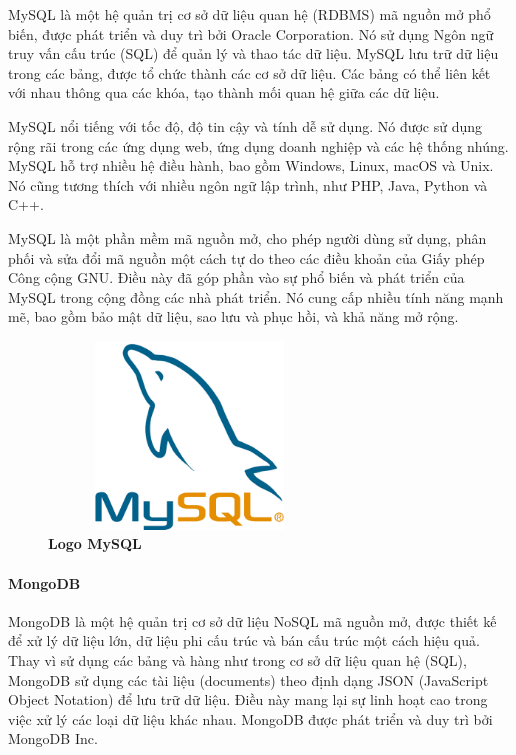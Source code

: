 MySQL là một hệ quản trị cơ sở dữ liệu quan hệ (RDBMS) mã nguồn mở phổ biến, được phát triển và duy trì bởi Oracle Corporation. Nó sử dụng Ngôn ngữ truy vấn cấu trúc (SQL) để quản lý và thao tác dữ liệu. MySQL lưu trữ dữ liệu trong các bảng, được tổ chức thành các cơ sở dữ liệu. Các bảng có thể liên kết với nhau thông qua các khóa, tạo thành mối quan hệ giữa các dữ liệu.

MySQL nổi tiếng với tốc độ, độ tin cậy và tính dễ sử dụng. Nó được sử dụng rộng rãi trong các ứng dụng web, ứng dụng doanh nghiệp và các hệ thống nhúng. MySQL hỗ trợ nhiều hệ điều hành, bao gồm Windows, Linux, macOS và Unix. Nó cũng tương thích với nhiều ngôn ngữ lập trình, như PHP, Java, Python và C++.

MySQL là một phần mềm mã nguồn mở, cho phép người dùng sử dụng, phân phối và sửa đổi mã nguồn một cách tự do theo các điều khoản của Giấy phép Công cộng GNU. Điều này đã góp phần vào sự phổ biến và phát triển của MySQL trong cộng đồng các nhà phát triển. Nó cung cấp nhiều tính năng mạnh mẽ, bao gồm bảo mật dữ liệu, sao lưu và phục hồi, và khả năng mở rộng.

\begin{figure}[H]
	\centering
	\includegraphics[width=7.5cm,height=5cm]{Images/Technology/mysql.png}
	\caption[Logo MySQL]{\bfseries \fontsize{12pt}{0pt}
		\selectfont Logo MySQL}
	\label{mysql} %
\end{figure}

\paragraph{MongoDB}
\mbox{}

MongoDB là một hệ quản trị cơ sở dữ liệu NoSQL mã nguồn mở, được thiết kế để xử lý dữ liệu lớn, dữ liệu phi cấu trúc và bán cấu trúc một cách hiệu quả. Thay vì sử dụng các bảng và hàng như trong cơ sở dữ liệu quan hệ (SQL), MongoDB sử dụng các tài liệu (documents) theo định dạng JSON (JavaScript Object Notation) để lưu trữ dữ liệu. Điều này mang lại sự linh hoạt cao trong việc xử lý các loại dữ liệu khác nhau. MongoDB được phát triển và duy trì bởi MongoDB Inc.


